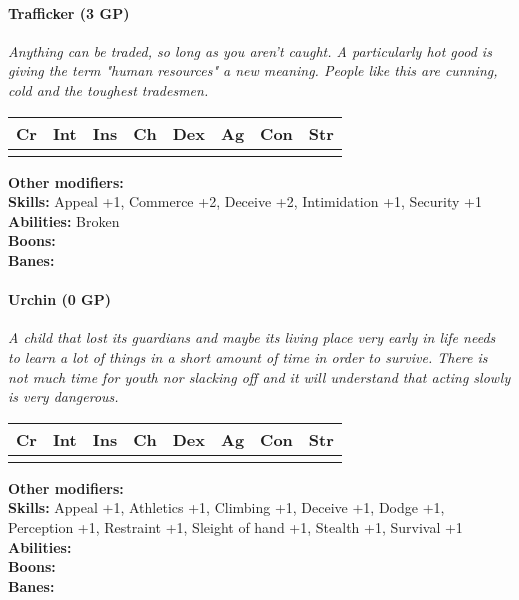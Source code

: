 \paragraph*{Trafficker (3 GP)}
\textit{Anything can be traded, so long as you aren't caught. A particularly hot good is giving the term "human resources" a new meaning. People like this are cunning, cold and the toughest tradesmen.}\par
\begin{tabular}{|l|l|l|l|l|l|l|l|}
	\hline
	Cr & Int & Ins & Ch & Dex & Ag & Con & Str \\ \hline
	&  &  &  &  &  &  &  \\ \hline
\end{tabular}\par
\noindent\textbf{Other modifiers:} \\
\textbf{Skills:} Appeal +1,
Commerce +2,
Deceive +2,
Intimidation +1,
Security +1\\
\textbf{Abilities:} Broken\\
\textbf{Boons:} \\
\textbf{Banes:}

\hrulefill
\paragraph*{Urchin (0 GP)}
\textit{A child that lost its guardians and maybe its living place very early in life needs to learn a lot of things in a short amount of time in order to survive. There is not much time for youth nor slacking off and it will understand that acting slowly is very dangerous.}\par
\begin{tabular}{|l|l|l|l|l|l|l|l|}
	\hline
	Cr & Int & Ins & Ch & Dex & Ag & Con & Str \\ \hline
	&  &  &  &  &  &  &  \\ \hline
\end{tabular}\par
\noindent\textbf{Other modifiers:} \\
\textbf{Skills:} Appeal +1,
Athletics +1,
Climbing +1,
Deceive +1,
Dodge +1,
Perception +1,
Restraint +1,
Sleight of hand +1,
Stealth +1,
Survival +1\\
\textbf{Abilities:} \\
\textbf{Boons:} \\
\textbf{Banes:} \\

\hrulefill
